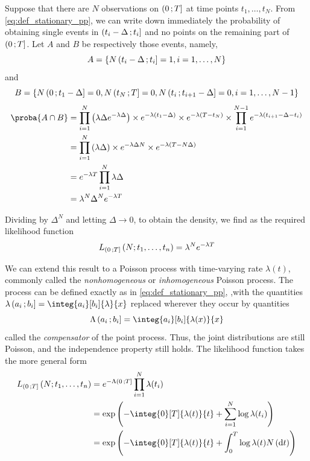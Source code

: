 Suppose that there are $N$ observations on $\left( 0 \, ; T \right]$ at time points $t_1,\dots,t_N$. From \ref{eq:def_stationary_pp}, we can write down immediately the probability of obtaining single events in $\left( t_i-\Delta \, ; t_i \right]$ and no points on the remaining part of $\left( 0 \, ; T \right]$.
Let $A$ and $B$ be respectively those events, namely, 
$$A = \left\lbrace N\left( t_i-\Delta \, ; t_i \right] = 1, i=1,\dots,N \right\rbrace$$
and
$$B = \left\lbrace N\left( 0 \, ; t_{1}-\Delta \right] = 0, N\left( t_N \, ; T \right] = 0, N\left( t_i \, ; t_{i+1}-\Delta \right] = 0, i=1,\dots,N-1 \right\rbrace$$
\begin{align*}
    \proba{A\cap B} &= \prod_{i=1}^N \pars{\lambda\Delta e^{-\lambda\Delta}} \times e^{-\lambda\pars{t_1 - \Delta}} \times e^{-\lambda\pars{T-t_N}} \times \prod_{i=1}^{N-1} e^{-\lambda\pars{t_{i+1}-\Delta-t_i}} \\
    &= \prod_{i=1}^N \pars{\lambda\Delta} \times e^{-\lambda \Delta N} \times e^{-\lambda\pars{T-N\Delta}} \\
    &= e^{-\lambda T} \prod_{i=1}^N \lambda\Delta \\
    &= \lambda^N \Delta^N e^{-\lambda T}
\end{align*}

Dividing by $\Delta^N$ and letting $\Delta \xrightarrow{} 0$, to obtain the density, we find as the required likelihood function
\begin{equation}
    L_{\left( 0 \, ; T \right]}\left( N;t_1,\dots,t_n \right) = \lambda^N e^{-\lambda T}
\end{equation}

We can extend this result to a Poisson process with time-varying rate $\lambda(t)$, commonly called the \textit{nonhomogeneous} or \textit{inhomogeneous} Poisson process.
The process can be defined exactly as in \ref{eq:def_stationary_pp}, ,with the quantities $\lambda\intervalleOF{a_i}{b_i} = \integ{a_i}[b_i]{\lambda}{x}$ replaced wherever they occur by quantities
$$ \Lambda\intervalleOF{a_i}{b_i} = \integ{a_i}[b_i]{\lambda(x)}{x}$$
called the \textit{compensator} of the point process.
Thus, the joint distributions are still Poisson, and the independence property still holds.
The likelihood function takes the more general form
\begin{equation}\label{eq:general_likelihood}
\begin{split}
    L_{\intervalleOF{0}{T}}\pars{N;t_1,\dots,t_n} &= e^{-\Lambda\intervalleOF{0}{T}} \prod_{i=1}^N \lambda(t_i) \\
    &= \e{-\integ{0}[T]{\lambda(t)}{t} + \sum_{i=1}^N \log \lambda(t_i)} \\
    &= \e{-\integ{0}[T]{\lambda(t)}{t} + \int_0^T \log \lambda(t)N\pars{\dint t}}
\end{split}
\end{equation}

